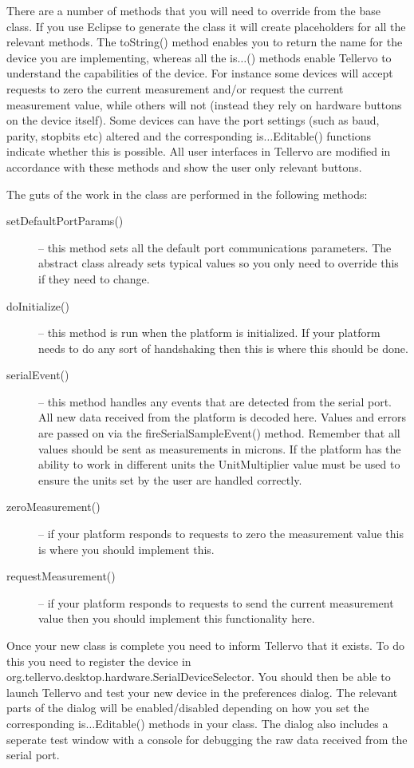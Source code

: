 There are a number of methods that you will need to override from the base class.  If you use Eclipse to generate the class it will create placeholders for all the relevant methods.  The toString() method enables you to return the name for the device you are implementing, whereas all the is$\ldots$() methods enable Tellervo to understand the capabilities of the device.  For instance some devices will accept requests to zero the current measurement and/or request the current measurement value, while others will not (instead they rely on hardware buttons on the device itself).  Some devices can have the port settings (such as baud, parity, stopbits etc) altered and the corresponding is$\ldots$Editable() functions indicate whether this is possible.  All user interfaces in Tellervo are modified in accordance with these methods and show the user only relevant buttons.

The guts of the work in the class are performed in the following methods:

\begin{description}
 \item[setDefaultPortParams()] -- this method sets all the default port communications parameters.  The abstract class already sets typical values so you only need to override this if they need to change.
 \item[doInitialize()] -- this method is run when the platform is initialized.  If your platform needs to do any sort of handshaking then this is where this should be done.
 \item[serialEvent()] -- this method handles any events that are detected from the serial port.  All new data received from the platform is decoded here.  Values and errors are passed on via the fireSerialSampleEvent() method.  Remember that all values should be sent as measurements in microns.  If the platform has the ability to work in different units the UnitMultiplier value must be used to ensure the units set by the user are handled correctly.
 \item[zeroMeasurement()] -- if your platform responds to requests to zero the measurement value this is where you should implement this.  
 \item[requestMeasurement()] -- if your platform responds to requests to send the current measurement value then you should implement this functionality here.
\end{description} 

Once your new class is complete you need to inform Tellervo that it exists.  To do this you need to register the device in org.tellervo.desktop.hardware.SerialDeviceSelector.  You should then be able to launch Tellervo and test your new device in the preferences dialog.  The relevant parts of the dialog will be enabled/disabled depending on how you set the corresponding is$\ldots$Editable() methods in your class.  The dialog also includes a seperate test window with a console for debugging the raw data received from the serial port.  

